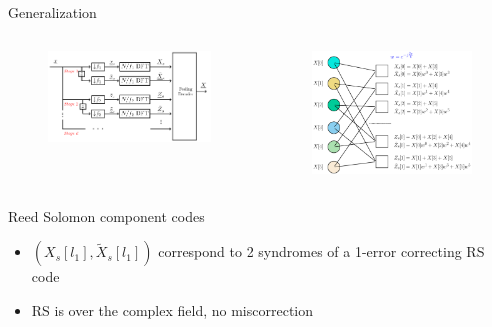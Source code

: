 	\begin{frame}{Generalization}
		
		
	\begin{columns}
			\begin{figure}[t]
				\centering
				\includegraphics[width=2.5in]{./Figures/FFAST_2stages}
			\end{figure}
			\vspace{-6mm}
			\hspace{-1.5in}
			
			\begin{figure}[t]
				
				\includegraphics[width=2.45in]{./Figures/Factorgraph_example_tilde}
			\end{figure}
			
		\end{columns}
%				
		\begin{block}{Reed Solomon component codes}
			\begin{itemize}
				\item $(X_s[l_1],\tilde{X}_s[l_1])$ correspond to 2 syndromes of a 1-error correcting RS code
                \item RS is over the complex field, no miscorrection
			\end{itemize}
		\end{block}
	\end{frame}	
